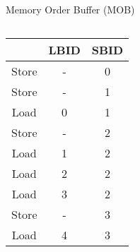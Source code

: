 \documentclass[aspectratio=169,12pt]{beamer}
\begin{document}
\begin{frame}{Memory Order Buffer (MOB)}
\begin{columns}
    \begin{column}{0.3\textwidth}
      \begin{center}
        \begin{tabular}{|c|c|c|}
          \hline
          & \textbf{LBID} & \textbf{SBID} \\
          \hline
          \rowcolor{blue!15} Store & - & 0 \\
          \hline
          \rowcolor{green!15} Store & - & 1 \\
          \hline
          \rowcolor{green!15} Load & 0 & 1 \\
          \hline
          \rowcolor{orange!15} Store & - & 2 \\
          \hline
          \rowcolor{orange!15} Load & 1 & 2 \\
          \hline
          \rowcolor{orange!15} Load & 2 & 2 \\
          \hline
          \rowcolor{orange!15} Load & 3 & 2 \\
          \hline
          \rowcolor{red!15} Store & - & 3 \\
          \hline
          \rowcolor{red!15} Load & 4 & 3 \\
          \hline
        \end{tabular}
      \end{center}
    \end{column}
  \end{columns}
\end{frame}
\end{document}
